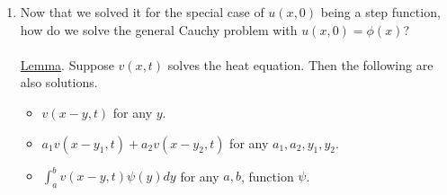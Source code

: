 \documentclass[12pt, letterpaper]{article}
\begin{document}
\begin{enumerate}
    Now fix $x < 0$ and send $t \rightarrow 0$ so that $\frac{x}{\sqrt{4kt}} \rightarrow - \infty$.
    We have the following 
    \begin{align*}
        0 = u(x,0) = c_1 \int_{0}^{-\infty} e^{-s^2} ds + c_2
    \end{align*}
    The key result here is 
    \begin{align*}
        \int_{0}^{\infty} e^{-s^2} ds = \int_{-\infty}^{0} e^{-s^2} ds = \frac{\sqrt{\pi}}{2} = \frac{1}{2} \int_{-\infty}^{\infty} e^{-s^2}ds
    \end{align*}
    This means our IC becomes
    \begin{align*}
        c_1 \frac{\sqrt \pi}{2} + c_2 &= 1 \\
        -c_1 \frac{\sqrt{\pi}}{2} + c_2 &= 0 \\
        c_2 &= \frac 12 \\
        c_1 = \frac{1}{\sqrt \pi}
    \end{align*}
    \textbf{Definition}. The error function $\text{erf}(z)$ is defined by 
    \begin{align*}
        \text{erf}(z) &= \frac{2}{\sqrt{\pi}} \int_{0}^{z}e^{-s^2}ds \\
        \Rightarrow \text{erf}(0) &= 0 \\
        \Rightarrow \lim_{z \rightarrow\infty} \text{erf}(z) &= 1 \\
        \Rightarrow u(x,t) &= \frac 12 \left( 1 + \text{erf}\left(\frac{x}{\sqrt{4kt}}\right)\right)
    \end{align*}
    This gives us the solution to the heat equation $u_t - ku_{xx} = 0$ for $u(x,0) = \begin{cases}
        1 & x > 0 \\
        0 & x < 0
    \end{cases}$
    \item Now that we solved it for the special case of $u(x,0)$ being a step function, how do
    we solve the general Cauchy problem with $u(x,0) = \phi(x)$?  \\ \\ 
    \underline{Lemma}. Suppose $v(x,t)$ solves the heat equation. Then the following are also 
    solutions.
    \begin{itemize}
        \item $v(x-y,t)$ for any $y$.
        \item $a_1v(x-y_1,t) + a_2v(x-y_2,t)$ for any $a_1, a_2, y_1, y_2$.
        \item $\int_{a}^{b} v(x-y,t)\psi(y)dy$ for any $a,b$, function $\psi$.

\end{itemize}
\end{enumerate}
\end{document}
